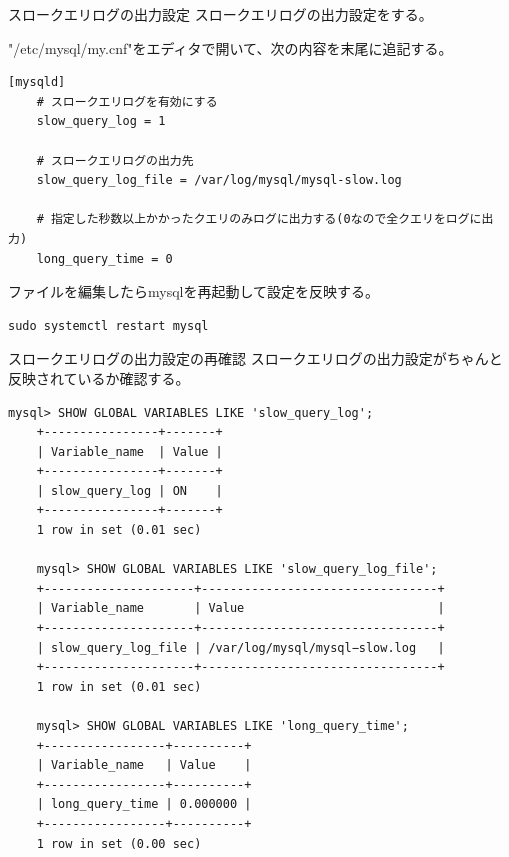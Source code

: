 \documentclass{beamer}
\begin{document}
\begin{frame}[fragile]{スロークエリログの出力設定}
  スロークエリログの出力設定をする。\par
  "/etc/mysql/my.cnf"をエディタで開いて、次の内容を末尾に追記する。
  \begin{lstlisting}[basicstyle=\tiny]
    [mysqld]
    # スロークエリログを有効にする
    slow_query_log = 1

    # スロークエリログの出力先
    slow_query_log_file = /var/log/mysql/mysql-slow.log

    # 指定した秒数以上かかったクエリのみログに出力する(0なので全クエリをログに出力)
    long_query_time = 0
  \end{lstlisting}

  ファイルを編集したらmysqlを再起動して設定を反映する。

  \begin{lstlisting}[basicstyle=\tiny]
    sudo systemctl restart mysql
  \end{lstlisting}

\end{frame}

\begin{frame}[fragile]{スロークエリログの出力設定の再確認}
  スロークエリログの出力設定がちゃんと反映されているか確認する。\par
  \begin{lstlisting}[basicstyle=\tiny]
    mysql> SHOW GLOBAL VARIABLES LIKE 'slow_query_log';
    +----------------+-------+
    | Variable_name  | Value |
    +----------------+-------+
    | slow_query_log | ON    |
    +----------------+-------+
    1 row in set (0.01 sec)

    mysql> SHOW GLOBAL VARIABLES LIKE 'slow_query_log_file';
    +---------------------+---------------------------------+
    | Variable_name       | Value                           |
    +---------------------+---------------------------------+
    | slow_query_log_file | /var/log/mysql/mysql−slow.log   |
    +---------------------+---------------------------------+
    1 row in set (0.01 sec)

    mysql> SHOW GLOBAL VARIABLES LIKE 'long_query_time';
    +-----------------+----------+
    | Variable_name   | Value    |
    +-----------------+----------+
    | long_query_time | 0.000000 |
    +-----------------+----------+
    1 row in set (0.00 sec)
  \end{lstlisting}
\end{frame}
\end{document}
